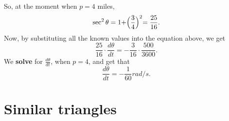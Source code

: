 \documentclass{ximera}
\begin{document}
\begin{example}
\begin{explanation}
\begin{image}
\end{image}

So, at the moment when $p=4$ miles,
\[
\sec^2{\theta}=1+\Bigr(\frac{3}{4}\Bigl)^2=\frac{25}{16}.
\] 
Now, by substituting all the known values into the equation above, we get
\[
\frac{25}{16}\cdot \frac{d\theta}{dt}= -\frac{3}{16}\cdot \frac{500}{3600}.
\] 
We \textbf{solve} for $\frac{d\theta}{dt}$, when $p=4$, and get that
\[
\frac{d\theta}{dt} = -\frac{1}{60}  rad/s.
\] 
\end{explanation}
\end{example}

\section{Similar triangles}
\end{document}
